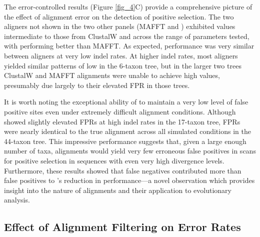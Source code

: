 \documentclass{article}
\begin{document}
The error-controlled \tpr results (Figure \ref{fig_4}C) provide a
comprehensive picture of the effect of alignment error on the detection of
\sw positive selection. The two aligners not shown in the two other
panels (MAFFT and \pranka) exhibited \tpr values intermediate to those
from ClustalW and \prankc across the range of parameters tested, with \pranka performing
better than MAFFT. As
expected, performance was very similar between aligners at very low
indel rates. At higher indel rates, most aligners yielded similar
patterns of low \tpr in the 6-taxon tree, but in the larger two trees
ClustalW and MAFFT alignments were unable to achieve high \tpr
values, presumably due largely to their elevated FPR in those trees.

It is worth noting the exceptional ability of \prankc to maintain a
very low level of false positive sites even under extremely difficult
alignment conditions. Although \prankc showed slightly elevated FPRs
at high indel rates in the 17-taxon tree, FPRs were nearly identical
to the true alignment across all simulated conditions in the 44-taxon
tree. This impressive performance suggests that, given a large enough
number of taxa, \prankc alignments would yield very few erroneous
false positives in scans for positive selection in sequences with even very
high divergence levels. Furthermore, these results showed that false
negatives contributed more than false positives to \prankc{}'s
reduction in \sw performance---a novel observation which provides
insight into the nature of \prankc alignments and their application to
\sw evolutionary analysis.

\subsection*{Effect of Alignment Filtering on \Sw Error Rates}
\end{document}
